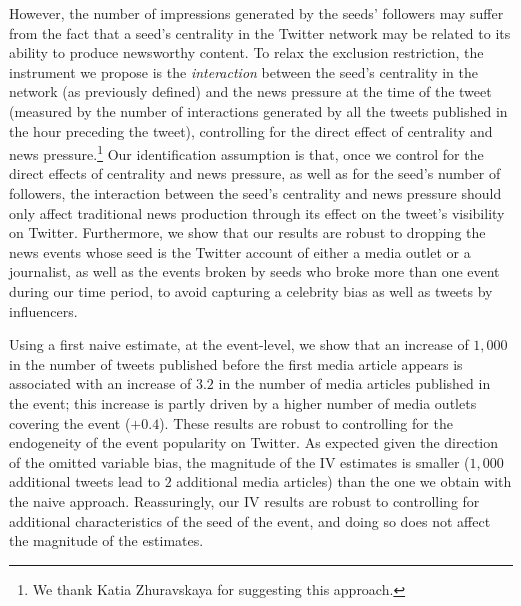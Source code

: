 

However, the number of impressions generated by the seeds' followers may suffer from the fact that a seed's centrality in the Twitter network may be related to its ability to produce newsworthy content. To relax the exclusion restriction, the instrument we propose is the \textit{interaction} between the seed's centrality in the network (as previously defined) and the news pressure at the time of the tweet (measured by the number of interactions generated by all the tweets published in the hour preceding the tweet), controlling for the direct effect of centrality and news pressure.\footnote{We thank Katia Zhuravskaya for suggesting this approach.} Our identification assumption is that, once we control for the direct effects of centrality and news pressure, as well as for the seed's number of followers, the interaction between the seed's centrality and news pressure should only affect traditional news production through its effect on the tweet's visibility on Twitter. Furthermore, we show that our results are robust to dropping the news events whose seed is the Twitter account of either a media outlet or a journalist, as well as the events broken by seeds who broke more than one event during our time period, to avoid capturing a celebrity bias as well as tweets by influencers.


Using a first naive estimate, at the event-level, we show that an increase of $1,000$ in the number of tweets published before the first media article appears is associated with an increase of $3.2$ in the number of media articles published in the event; this increase is partly driven by a higher number of media outlets covering the event ($+0.4$). These results are robust to controlling for the endogeneity of the event popularity on Twitter. As expected given the direction of the omitted variable bias, the magnitude of the IV estimates is smaller ($1,000$ additional tweets lead to $2$ additional media articles) than the one we obtain with the naive approach. Reassuringly, our IV results are robust to controlling for additional characteristics of the seed of the event, and doing so does not affect the magnitude of the estimates.


